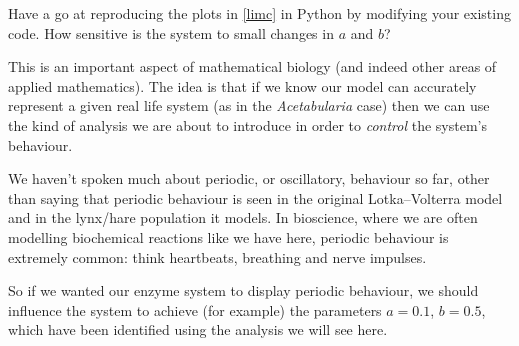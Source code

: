 \documentclass[main.tex]{subfiles}
\begin{document}
\begin{do-it-yourself}
Have a go at reproducing the plots in \cref{limc} in Python by modifying your existing code. How sensitive is the system to small changes in $a$ and $b$?
\end{do-it-yourself}

This is an important aspect of mathematical biology (and indeed other areas of applied mathematics). The idea is that  if we know our model can accurately represent a given real life system (as in the \emph{Acetabularia} case) then we can use the kind of analysis we are about to introduce in order to \emph{control} the system's behaviour. 

We haven't spoken much about periodic, or oscillatory, behaviour so far, other than saying that periodic behaviour is seen in the original Lotka--Volterra model and in the lynx/hare population it models. In bioscience, where we are often modelling biochemical reactions like we have here, periodic behaviour is extremely common: think heartbeats, breathing and nerve impulses.

So if we wanted our enzyme system to display periodic behaviour, we should influence the system to achieve (for example) the parameters $a=0.1$, $b=0.5$, which have been identified using the analysis we will see here. 






\end{document}
